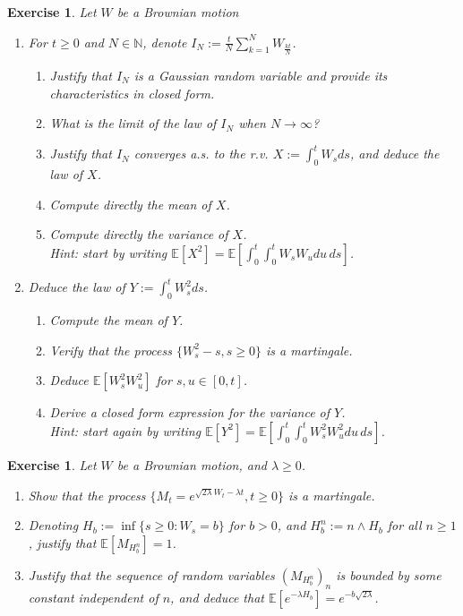 \documentclass{article}
\newtheorem{Exercise}[Theorem]{Exercise}
\def \E{\mathbb{E}}
\def \N{\mathbb{N}}
\begin{document}
\begin{Exercise}
Let $W$ be a Brownian motion 
\begin{enumerate}
\item For $t\ge 0$ and $N\in\N$, denote $I_N
:=
\frac{t}{N}\sum_{k=1}^NW_{\frac{kt}{N}}
$.
\begin{enumerate}
\item Justify that $I_N$ is a Gaussian random variable and provide its characteristics in closed form.
\item What is the limit of the law of $I_N$ when $N\to\infty$?
\item Justify that $I_N$ converges a.s. to the r.v. $X:=\int_0^t W_s ds$, and deduce the law of $X$.
\item Compute directly the mean of $X$.
\item Compute directly the variance of $X$. 
\\
Hint: start by writing $\E[X^2]=\E[\int_0^t\int_0^tW_sW_udu\,ds]$.
\end{enumerate}
\item Deduce the law of $Y:=\int_0^t W^2_s ds$.
\begin{enumerate}
\item Compute the mean of $Y$.
\item Verify that the process $\{W^2_s-s,s\ge 0\}$ is a martingale.
\item Deduce $\E[W_s^2W_u^2]$ for $s,u\in[0,t]$.
\item Derive a closed form expression for the variance of $Y$. 
\\
Hint: start again by writing $\E[Y^2]=\E[\int_0^t\int_0^tW_s^2W_u^2du\,ds]$.
\end{enumerate}
\end{enumerate}

\end{Exercise}
\begin{Exercise}
Let $W$ be a Brownian motion, and $\lambda\ge 0$.
\begin{enumerate}
\item Show that the process $\{M_t=e^{\sqrt{2\lambda}W_t-\lambda t},t\ge 0\}$ is a martingale.
\item Denoting $H_b:=\inf\{s\ge 0: W_s=b\}$ for $b>0$, and $H_b^n:=n\wedge H_b$ for all $n\ge 1$, justify that $\E[M_{H^n_b}]=1$. 
\item Justify that the sequence of random variables $(M_{H^n_b})_n$ is bounded by some constant independent of $n$, and  deduce that $\E[e^{-\lambda H_b}]=e^{-b\sqrt{2\lambda}}$.
\end{enumerate}
\end{Exercise}
\end{document}
